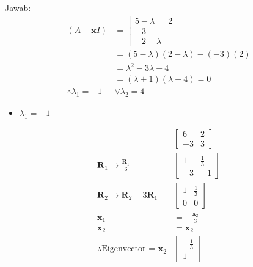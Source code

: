 \documentclass[12pt, a4paper]{scrartcl}
\begin{document}
\begin{enumerate}
\begin{enumerate}
                Jawab:
                \begin{align*}
                    (A-\textbf{x}I) &= \begin{bmatrix}
                        5-\lambda&2\\-3\\-2-\lambda
                    \end{bmatrix}
                    \\ &=(5-\lambda)(2-\lambda)-(-3)(2)
                    \\ &=\lambda^2-3\lambda-4
                    \\ &=(\lambda+1)(\lambda-4)=0
                    \\ \therefore \lambda_1=-1 &\lor \lambda_2=4 
                \end{align*}
                \begin{itemize}
                    \item[] $\lambda_1 = -1$
                \end{itemize}
                \begin{align*}
                    &\begin{bmatrix}
                        6&2\\-3&3    
                    \end{bmatrix}
                    \\ \textbf{R}_1 \to \frac{\textbf{R}_1}{6} &\begin{bmatrix}
                        1&\frac{1}{3}\\-3&-1
                    \end{bmatrix}
                    \\ \textbf{R}_2 \to \textbf{R}_2 - 3\textbf{R}_1 &\begin{bmatrix}
                        1&\frac{1}{3}\\0&0
                    \end{bmatrix}
                    \\ \textbf{x}_1 &= -\frac{\textbf{x}_2}{3}
                    \\ \textbf{x}_2 &= \textbf{x}_2
                    \\ \therefore \mbox{Eigenvector = }\textbf{x}_2&\begin{bmatrix}
                        -\frac{1}{3}\\1
                    \end{bmatrix}
                \end{align*}


\end{enumerate}
\end{enumerate}
\end{document}

